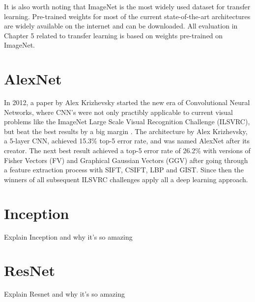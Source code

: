 It is also worth noting that ImageNet is the most widely used dataset for transfer learning. Pre-trained weights for most of the current state-of-the-art architectures are widely available on the internet and can be downloaded. All evaluation in Chapter 5 related to transfer learning is based on weights pre-trained on ImageNet.

\section{AlexNet}

In 2012, a paper by Alex Krizhevsky started the new era of Convolutional Neural Networks, where CNN's were not only practibly applicable to current visual problems like the ImageNet Large Scale Visual Recognition Challenge (ILSVRC), but beat the best results by a big margin \cite{krizhevsky2012imagenet, imagenet}. The architecture by Alex Krizhevsky, a 5-layer CNN, achieved 15.3\% top-5 error rate, and was named AlexNet after its creator. The next best result achieved a top-5 error rate of 26.2\% with versions of Fisher Vectors (FV) and Graphical Gaussian Vectors (GGV) after going through a feature extraction process with SIFT, CSIFT, LBP and GIST. Since then the winners of all subsequent ILSVRC challenges apply all a deep learning approach.



\section{Inception}

Explain Inception and why it's so amazing

\section{ResNet}

Explain Resnet and why it's so amazing
